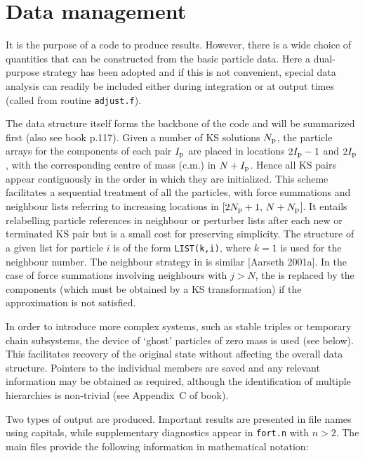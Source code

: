 \documentclass[12pt]{article}
\begin{document}
\section{Data management} \label{data}

It is the purpose of a code to produce results.
However, there is a wide choice of quantities that can be constructed from
the basic particle data.
Here a dual-purpose strategy has been adopted and if this is not convenient,
special data analysis can readily be included either during integration or
at output times (\ie called from routine {\tt adjust.f}).

The data structure itself forms the backbone of the code and will be
summarized first (also see book p.117).
Given a number of KS solutions $N_{\rm p}$, the particle arrays for the
components of each pair $I_{\rm p}$ are placed in locations $2 I_{\rm p}-1$
and $2 I_{\rm p}$, with the corresponding centre of mass (c.m.) in
$N + I_{\rm p}$.
Hence all KS pairs appear contiguously in the order in which they are
initialized.
This scheme facilitates a sequential treatment of all the particles, with
force summations and neighbour lists referring to increasing locations in
[$2 N_{\rm p}+1, \, N + N_{\rm p}$].
It entails relabelling particle references in neighbour or perturber lists
after each new or terminated KS pair but is a small cost for preserving
simplicity.
The structure of a given list for particle $i$ is of the form
{\tt LIST(k,i)}, where $k=1$ is used for the neighbour number.
The neighbour strategy in {} is similar [Aarseth 2001a].
In the case of force summations involving neighbours with $j > N$, the \cm is
replaced by the components (which must be obtained by a KS transformation) if
the \cm approximation is not satisfied.

In order to introduce more complex systems, such as stable triples or
temporary chain subsystems, the device of `ghost' particles of zero mass is
used (see below).
This facilitates recovery of the original state without affecting the overall
data structure.
Pointers to the individual members are saved and any relevant information may
be obtained as required, although the identification of multiple hierarchies
is non-trivial (see Appendix~C of book).

Two types of output are produced.
Important results are presented in file names using capitals, while
supplementary diagnostics appear in {\tt fort.n} with $n > 2$.
The main files provide the following information in mathematical notation:
\end{document}
